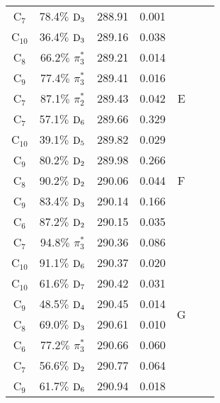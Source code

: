 \documentclass[12pt]{article}
\begin{document}
\begin{table}[!h]
\begin{tabular}{c@{\hskip 0.22in}c@{\hskip 0.22in}c@{\hskip 0.22in}c@{\hskip 0.52in}c@{\hskip 0.22in}c@{\hskip 0.22in}c}
    C$_7$
 &   78.4$\%$ $\rm D_3$  & 288.91 & 0.001 \\
    C$_{10}$
 &   36.4$\%$ $\rm D_3$  & 289.16 & 0.038 \\
    C$_8$
 &   66.2$\%$ $\pi_3^*$  & 289.21 & 0.014 
 \vspace{0.1in}\\
    C$_9$
 &   77.4$\%$ $\pi_3^*$  & 289.41 & 0.016 & \multirow{3}{*}{E} \\
    C$_7$
 &   87.1$\%$ $\pi_2^*$  & 289.43 & 0.042 \\
    C$_7$
 &   57.1$\%$ $\rm D_6$  & 289.66 & 0.329 
 \vspace{0.1in}\\
    C$_{10}$
 &   39.1$\%$ $\rm D_5$  & 289.82 & 0.029 & \multirow{5}{*}{F} \\
    C$_9$
 &   80.2$\%$ $\rm D_2$  & 289.98 & 0.266 \\
    C$_8$
 &   90.2$\%$ $\rm D_2$  & 290.06 & 0.044 \\
    C$_9$
 &   83.4$\%$ $\rm D_3$  & 290.14 & 0.166 \\
    C$_6$
 &   87.2$\%$ $\rm D_2$  & 290.15 & 0.035 
 \vspace{0.1in}\\
    C$_7$
 &   94.8$\%$ $\pi_3^*$  & 290.36 & 0.086  & \multirow{8}{*}{G} \\
    C$_{10}$
 &   91.1$\%$ $\rm D_6$  & 290.37 & 0.020 \\
    C$_{10}$
 &   61.6$\%$ $\rm D_7$  & 290.42 & 0.031 \\
    C$_9$
 &   48.5$\%$ $\rm D_4$  & 290.45 & 0.014 \\
    C$_8$
 &   69.0$\%$ $\rm D_3$  & 290.61 & 0.010 \\
    C$_6$
 &   77.2$\%$ $\pi_3^*$  & 290.66 & 0.060 \\
    C$_7$
 &   56.6$\%$ $\rm D_2$  & 290.77 & 0.064 \\
    C$_9$
 &   61.7$\%$ $\rm D_6$  & 290.94 & 0.018 \\
 \hline
 \hline
   \end{tabular}
   \label{table: adenine_k_carbon}
\end{table}
\end{document}
